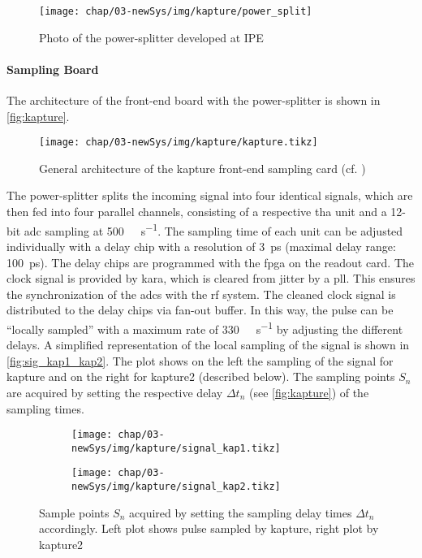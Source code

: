 \begin{figure}[tb]
	\centering
	\texttt{[image: chap/03-newSys/img/kapture/power\_split]}
	\caption{Photo of the power-splitter developed at IPE}
	\label{fig:power_splitter}
\end{figure}

\paragraph{Sampling Board}
The architecture of the front-end board with the power-splitter is shown in \autoref{fig:kapture}. 
\begin{figure}[H]
	\centering
	\texttt{[image: chap/03-newSys/img/kapture/kapture.tikz]}
	\caption[General architecture of the KAPTURE system]{General architecture of the \Gls{kapture} front-end sampling card (cf. \cite[p.2]{caselleKAP})}
	\label{fig:kapture}
\end{figure}
The power-splitter splits the incoming signal into four identical signals, which are then fed into four parallel channels, consisting of a respective \gls{tha} unit and a 12-bit \gls{adc} sampling at \SI{500}{\mega\sample\per\second}. 
The sampling time of each unit can be adjusted individually with a delay chip with a resolution of \SI{3}{\pico \second} (maximal delay range: \SI{100}{\pico \second}). 
The delay chips are programmed with the \gls{fpga} on the readout card.
The clock signal is provided by \gls{kara}, which is cleared from jitter by a \gls{pll}. 
This ensures the synchronization of the \glspl{adc} with the \gls{rf} system. 
The cleaned clock signal is distributed to the delay chips via fan-out buffer. \cite{caselleKAP}
In this way, the pulse can be ``locally sampled'' with a maximum rate of \SI{330}{\giga\sample\per\second} by adjusting the different delays. \newline
A simplified representation of the local sampling of the signal is shown in \autoref{fig:sig_kap1_kap2}.
The plot shows on the left the sampling of the signal for \gls{kapture} and on the right for \gls{kapture2} (described below).
The sampling points $S_n$ are acquired by setting the respective delay $\Delta t_n$ (see \autoref{fig:kapture}) of the sampling times. 
\begin{figure}[tb]
	\centering
	\begin{subfigure}{0.48\textwidth}
		\centering
		\texttt{[image: chap/03-newSys/img/kapture/signal\_kap1.tikz]}  
		\label{fig:sig_kap1}
	\end{subfigure}
	\hfill
	\begin{subfigure}{0.48\textwidth}
		\centering
		\texttt{[image: chap/03-newSys/img/kapture/signal\_kap2.tikz]}  
		\label{fig:sig_kap2}
	\end{subfigure}
	\caption[KAPTURE Pulse Sampling]{Sample points $S_n$ acquired by setting the sampling delay times $\Delta t_n$ accordingly. Left plot shows pulse sampled by \gls{kapture}, right plot by \gls{kapture2}}
	\label{fig:sig_kap1_kap2}
\end{figure}

